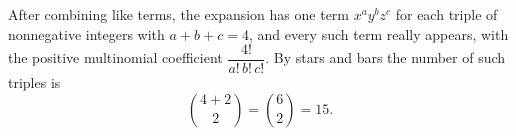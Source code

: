 After combining like terms, the expansion has one term $x^ay^bz^c$ for each triple of nonnegative integers with $a+b+c=4$, and every such term really appears, with the positive multinomial coefficient $\dfrac{4!}{a!\,b!\,c!}$. By stars and bars the number of such triples is
\[
\binom{4+2}{2}=\binom62=\boxed{15} .
\]
